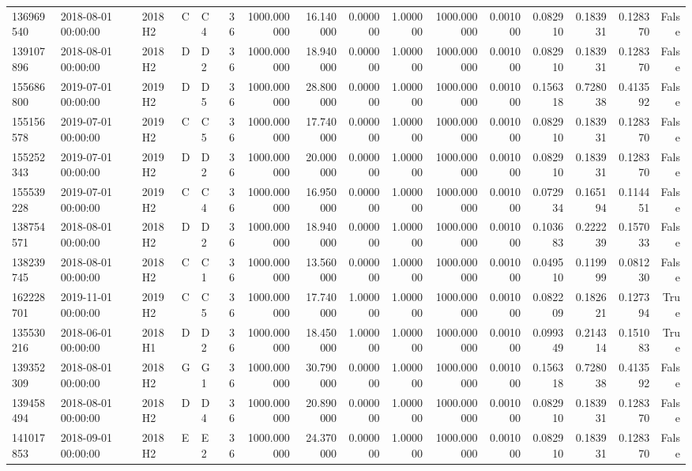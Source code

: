 \begin{tabular}{lllllrrrrrrrrrrr}
136969540 & 2018-08-01 00:00:00 & 2018H2 & C & C4 & 36 & 1000.000000 & 16.140000 & 0.000000 & 1.000000 & 1000.000000 & 0.001000 & 0.082910 & 0.183931 & 0.128370 & False \\
139107896 & 2018-08-01 00:00:00 & 2018H2 & D & D2 & 36 & 1000.000000 & 18.940000 & 0.000000 & 1.000000 & 1000.000000 & 0.001000 & 0.082910 & 0.183931 & 0.128370 & False \\
155686800 & 2019-07-01 00:00:00 & 2019H2 & D & D5 & 36 & 1000.000000 & 28.800000 & 0.000000 & 1.000000 & 1000.000000 & 0.001000 & 0.156318 & 0.728038 & 0.413592 & False \\
155156578 & 2019-07-01 00:00:00 & 2019H2 & C & C5 & 36 & 1000.000000 & 17.740000 & 0.000000 & 1.000000 & 1000.000000 & 0.001000 & 0.082910 & 0.183931 & 0.128370 & False \\
155252343 & 2019-07-01 00:00:00 & 2019H2 & D & D2 & 36 & 1000.000000 & 20.000000 & 0.000000 & 1.000000 & 1000.000000 & 0.001000 & 0.082910 & 0.183931 & 0.128370 & False \\
155539228 & 2019-07-01 00:00:00 & 2019H2 & C & C4 & 36 & 1000.000000 & 16.950000 & 0.000000 & 1.000000 & 1000.000000 & 0.001000 & 0.072934 & 0.165194 & 0.114451 & False \\
138754571 & 2018-08-01 00:00:00 & 2018H2 & D & D2 & 36 & 1000.000000 & 18.940000 & 0.000000 & 1.000000 & 1000.000000 & 0.001000 & 0.103683 & 0.222239 & 0.157033 & False \\
138239745 & 2018-08-01 00:00:00 & 2018H2 & C & C1 & 36 & 1000.000000 & 13.560000 & 0.000000 & 1.000000 & 1000.000000 & 0.001000 & 0.049510 & 0.119999 & 0.081230 & False \\
162228701 & 2019-11-01 00:00:00 & 2019H2 & C & C5 & 36 & 1000.000000 & 17.740000 & 1.000000 & 1.000000 & 1000.000000 & 0.001000 & 0.082209 & 0.182621 & 0.127394 & True \\
135530216 & 2018-06-01 00:00:00 & 2018H1 & D & D2 & 36 & 1000.000000 & 18.450000 & 1.000000 & 1.000000 & 1000.000000 & 0.001000 & 0.099349 & 0.214314 & 0.151083 & True \\
139352309 & 2018-08-01 00:00:00 & 2018H2 & G & G1 & 36 & 1000.000000 & 30.790000 & 0.000000 & 1.000000 & 1000.000000 & 0.001000 & 0.156318 & 0.728038 & 0.413592 & False \\
139458494 & 2018-08-01 00:00:00 & 2018H2 & D & D4 & 36 & 1000.000000 & 20.890000 & 0.000000 & 1.000000 & 1000.000000 & 0.001000 & 0.082910 & 0.183931 & 0.128370 & False \\
141017853 & 2018-09-01 00:00:00 & 2018H2 & E & E2 & 36 & 1000.000000 & 24.370000 & 0.000000 & 1.000000 & 1000.000000 & 0.001000 & 0.082910 & 0.183931 & 0.128370 & False \\

\end{tabular}
